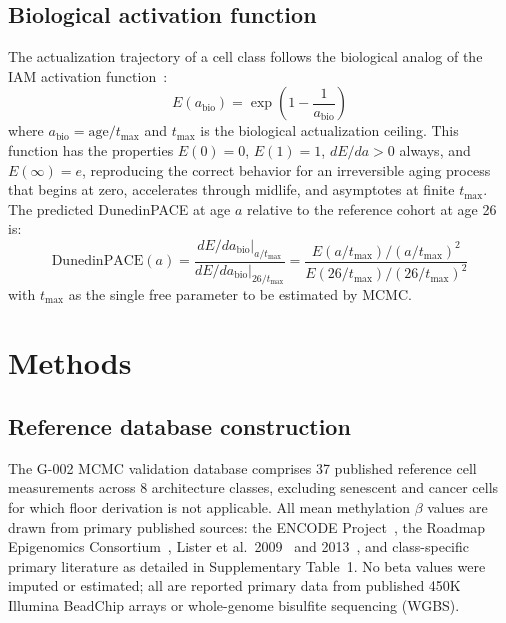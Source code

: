 \documentclass[12pt,a4paper]{article}
\begin{document}
\subsection{Biological activation function}
\label{sec:eabio}

The actualization trajectory of a cell class follows the biological analog
of the IAM activation function~\cite{Mahaffey2026}:
\begin{equation}
  E(a_{\mathrm{bio}}) = \exp\!\left(1 - \frac{1}{a_{\mathrm{bio}}}\right)
  \label{eq:eabio}
\end{equation}
where $a_{\mathrm{bio}} = \mathrm{age}/t_{\max}$ and $t_{\max}$ is the
biological actualization ceiling. This function has the properties
$E(0) = 0$, $E(1) = 1$, $dE/da > 0$ always, and $E(\infty) = e$,
reproducing the correct behavior for an irreversible aging process that
begins at zero, accelerates through midlife, and asymptotes at finite $t_{\max}$.
The predicted DunedinPACE at age $a$ relative to the reference cohort at
age 26 is:
\begin{equation}
  \mathrm{DunedinPACE}(a) = \frac{dE/da_{\mathrm{bio}}|_{a/t_{\max}}}{dE/da_{\mathrm{bio}}|_{26/t_{\max}}}
  = \frac{E(a/t_{\max})/(a/t_{\max})^2}{E(26/t_{\max})/(26/t_{\max})^2}
  \label{eq:pace}
\end{equation}
with $t_{\max}$ as the single free parameter to be estimated by MCMC.

\section{Methods}
\label{sec:methods}

\subsection{Reference database construction}
\label{sec:database}

The G-002 MCMC validation database comprises 37 published reference cell
measurements across 8 architecture classes, excluding senescent and cancer
cells for which floor derivation is not applicable. All mean methylation
$\beta$ values are drawn from primary published sources: the ENCODE
Project~\cite{ENCODE2012}, the Roadmap Epigenomics Consortium~\cite{Roadmap2015},
Lister et al.\ 2009~\cite{Lister2009} and 2013~\cite{Lister2013},
and class-specific primary literature as detailed in Supplementary Table~1.
No beta values were imputed or estimated; all are reported primary data from
published 450K Illumina BeadChip arrays or whole-genome bisulfite sequencing
(WGBS).
\end{document}
